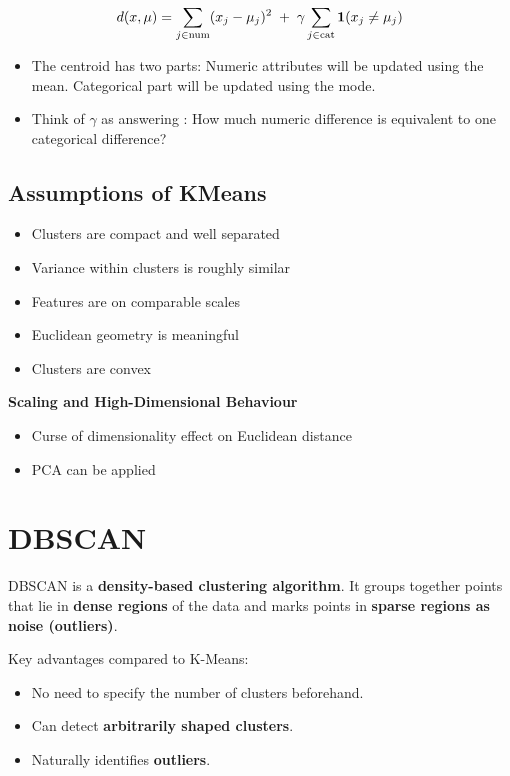 \documentclass[10pt,a4paper]{article}
\begin{document}
	\begin{align*}
		\Large d(x, \mu) =\sum_{j \in \text{num}} (x_j - \mu_j)^2\;+\;\gamma \sum_{j \in \text{cat}} \mathbf{1}(x_j \neq \mu_j)
	\end{align*}

	\begin{itemize}
		\item The centroid has two parts: Numeric attributes will be updated using the mean. Categorical part will be updated using the mode.
		\item Think of $\gamma$ as answering : How much numeric difference is equivalent to one categorical difference?
	\end{itemize}

	\subsection{Assumptions of KMeans}

	\begin{itemize}
		\item Clusters are compact and well separated
		\item Variance within clusters is roughly similar
		\item Features are on comparable scales
		\item Euclidean geometry is meaningful
		\item Clusters are convex
	\end{itemize}

	\textbf{Scaling and High-Dimensional Behaviour}

	\begin{itemize}
		\item Curse of dimensionality effect on Euclidean distance
		\item PCA can be applied
	\end{itemize}


	\section{DBSCAN}

	DBSCAN is a \textbf{density-based clustering algorithm}. It groups together points that lie in \textbf{dense regions} of the data and marks points in \textbf{sparse regions as noise (outliers)}.

	Key advantages compared to K-Means:

	\begin{itemize}
		\item No need to specify the number of clusters beforehand.
		\item Can detect \textbf{arbitrarily shaped clusters}.
		\item Naturally identifies \textbf{outliers}.
	\end{itemize}
\end{document}
